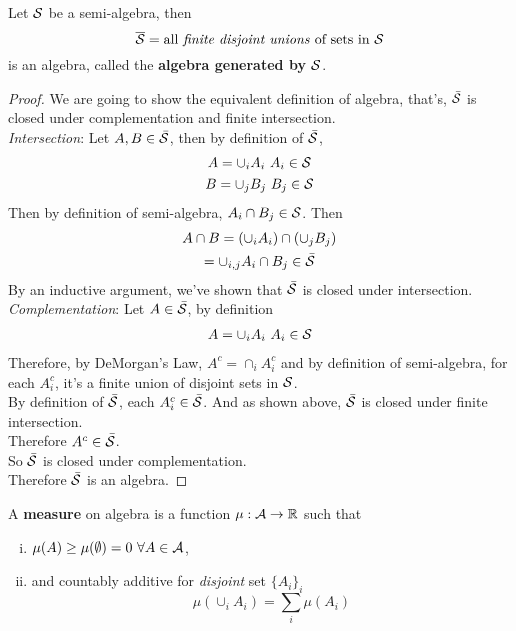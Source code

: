 \documentclass[11pt]{article}
\begin{document}
		\begin{lemma}
			Let $\mathcal{{S}}$ be a semi-algebra, then
			\begin{equation}
				\overline{\mathcal{{S}}} = \text{{all \emph{finite disjoint unions} of sets in }}\mathcal{{S}}
			\end{equation} is an algebra, called the \textbf{algebra generated by $\mathcal{{S}}$}.
		\end{lemma}
		\begin{proof}
			We are going to show the equivalent definition of algebra, that's, $\bar{\mathcal{{S}}}$ is closed under complementation and finite intersection. \\
			\emph{Intersection}: Let $A, B \in \bar{\mathcal{{S}}}$, then by definition of $\bar{\mathcal{{S}}}$,
			\begin{gather}
				A = \cup_i A_i\ A_i \in \mathcal{{S}} \\
				B = \cup_j B_j\ B_j \in \mathcal{{S}}
			\end{gather}
			Then by definition of semi-algebra, $A_i \cap B_j \in \mathcal{{S}}$. Then 
			\begin{gather}
				A \cap B = (\cup_i A_i) \cap (\cup_j B_j) \\
				= \cup_{i,j} A_i \cap B_j \in \bar{\mathcal{{S}}}
			\end{gather}
			By an inductive argument, we've shown that $\bar{\mathcal{{S}}}$ is closed under intersection. \\
			\emph{Complementation}: Let $A \in \bar{\mathcal{{S}}}$, by definition
			\begin{gather}
				A = \cup_i A_i\ A_i \in \mathcal{{S}}
			\end{gather}
			Therefore, by DeMorgan's Law, $A^c = \cap_i A_i^c$ and by definition of semi-algebra, for each $A_i^c$, it's a finite union of disjoint sets in $\mathcal{{S}}$. \\
			By definition of $\bar{\mathcal{{S}}}$, each $A_i^c \in \bar{\mathcal{{S}}}$. And as shown above, $\bar{\mathcal{{S}}}$ is closed under finite intersection.\\
			Therefore $A^c \in \bar{\mathcal{{S}}}$.\\
			So $\bar{\mathcal{{S}}}$ is closed under complementation. \\
			Therefore $\bar{\mathcal{{S}}}$ is an algebra.	
		\end{proof}
		
		\begin{definition}
			A \textbf{measure} on algebra is a function $\mu: \mathcal{{A}} \to \mathbb{R}$ such that
			\begin{enumerate}[(i)]
				\item $\mu(A) \geq \mu(\emptyset) = 0\ \forall A \in \mc{A}$,
				\item and countably additive for \emph{disjoint} set $\{A_i\}_i$
				\begin{equation}
					\mu(\cup_i A_i) = \sum_i \mu(A_i)
				\end{equation}
			\end{enumerate}
		\end{definition}
		
\end{document}
